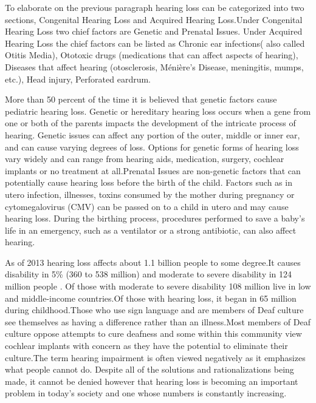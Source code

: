 \documentclass[sigconf]{acmart}
\begin{document}
To elaborate on the previous paragraph hearing loss can be categorized into two sections, Congenital Hearing Loss and Acquired Hearing Loss.Under Congenital Hearing Loss two chief factors are Genetic and Prenatal Issues. Under Acquired Hearing Loss the chief factors can be listed as Chronic ear infections( also called Otitis Media), Ototoxic drugs  (medications that can affect aspects of hearing), Diseases that affect hearing (otosclerosis, Ménière's Disease, meningitis, mumps, etc.), Head injury, Perforated eardrum\cite{Academy2017}.

More than 50 percent of the time it is believed that genetic factors cause pediatric hearing loss. Genetic or hereditary hearing loss occurs when a gene from one or both of the parents impacts the development of the intricate process of hearing. Genetic issues can affect any portion of the outer, middle or inner ear, and can cause varying degrees of loss. Options for genetic forms of hearing loss vary widely and can range from hearing aids, medication, surgery, cochlear implants or no treatment at all.Prenatal Issues are non-genetic factors that can potentially cause hearing loss before the birth of the child. Factors such as in utero infection, illnesses, toxins consumed by the mother during pregnancy or cytomegalovirus (CMV)  can be passed on to a child in utero and may cause hearing loss. During the birthing process, procedures performed to save a baby’s life in an emergency, such as a ventilator or a strong antibiotic, can also affect hearing.

As of 2013 hearing loss affects about 1.1 billion people to some degree\cite{Wikipedia2017}.It causes disability in 5\% (360 to 538 million) and moderate to severe disability in 124 million people \cite{Wikipedia2017} . Of those with moderate to severe disability 108 million live in low and middle-income countries.Of those with hearing loss, it began in 65 million during childhood.Those who use sign language and are members of Deaf culture see themselves as having a difference rather than an illness.Most members of Deaf culture oppose attempts to cure deafness and some within this community view cochlear implants with concern as they have the potential to eliminate their culture.The term hearing impairment is often viewed negatively as it emphasizes what people cannot do. Despite all of the solutions and rationalizations being made, it cannot be denied however that hearing loss is becoming an important problem in today's society and one whose numbers is constantly increasing.
\end{document}
